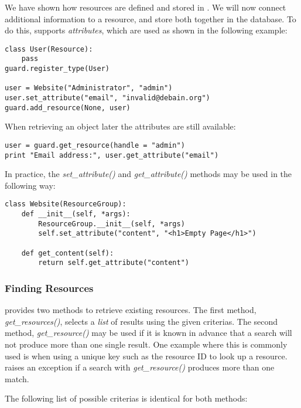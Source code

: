 We have shown how resources are defined and stored in \product. We will now 
connect additional information to a resource, and store both together in the 
database. To do this, \product supports {\it attributes}, which are used as 
shown in the following example:

\begin{lstlisting}
class User(Resource):
    pass
guard.register_type(User)

user = Website("Administrator", "admin")
user.set_attribute("email", "invalid@debain.org")
guard.add_resource(None, user)
\end{lstlisting}

When retrieving an object later the attributes are still available:

\begin{lstlisting}
user = guard.get_resource(handle = "admin")
print "Email address:", user.get_attribute("email")
\end{lstlisting}

In practice, the {\it set\_attribute()} and {\it get\_attribute()} methods 
may be used in the following way:

\begin{lstlisting}
class Website(ResourceGroup):
    def __init__(self, *args):
        ResourceGroup.__init__(self, *args)
        self.set_attribute("content", "<h1>Empty Page</h1>")

    def get_content(self):
        return self.get_attribute("content")
\end{lstlisting}


\subsubsection{\label{details:resources:find}Finding Resources}

\product provides two methods to retrieve existing resources. The first 
method, {\it get\_resources()}, selects a {\it list} of results using 
the given criterias. The second method, {\it get\_resource()} may be used 
if it is known in advance that a search will not produce more than one 
single result. One example where this is commonly used is when using a 
unique key such as the resource ID to look up a resource. \product raises 
an exception if a search with {\it get\_resource()} produces more than one 
match.

The following list of possible criterias is identical for both methods:

